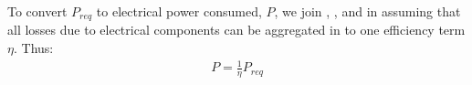 To convert $P_{req}$ to electrical power consumed, $P$, we join \cite{ware2016analysis}, \cite{kreciglowa2017energy}, and \cite{tagliabue2019model} in assuming that all losses due to electrical components can be aggregated in to one efficiency term $\eta$. Thus:
\begin{align}
    P = \frac{1}{\eta} P_{req}
\end{align}
